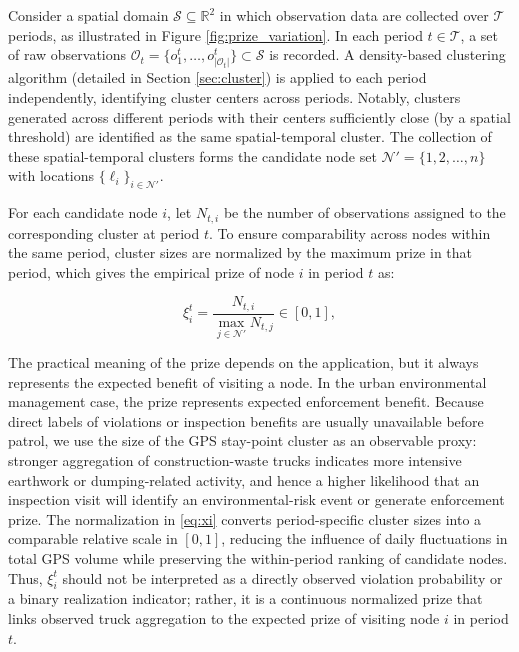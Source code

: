 \documentclass[preprint,12pt,authoryear]{elsarticle}
\theoremstyle{definition}
\begin{document}
Consider a spatial domain $\mathcal{S} \subseteq \mathbb{R}^2$ in which observation data are collected over $\mathcal{T}$ periods, as illustrated in Figure \ref{fig:prize_variation}. In each period $t \in \mathcal{T}$, a set of raw observations $\mathcal{O}_t = \{o_1^t, \dots, o_{|\mathcal{O}_t|}^t\}\subset \mathcal{S}$ is recorded. A density-based clustering algorithm (detailed in Section \ref{sec:cluster}) is applied to each period independently, identifying  cluster centers across periods. Notably, clusters generated across different periods with their centers sufficiently close (by a spatial threshold) are identified as the same spatial-temporal cluster. The collection of these spatial-temporal clusters forms the candidate node set $\mathcal{N'} = \{1, 2, \dots, n\}$ with locations $\{\ell_i\}_{i \in \mathcal{N'}}$.



For each candidate node $i$, let ${N}_{t,i}$ be the number of observations assigned to the corresponding cluster at period $t$. To ensure comparability across nodes within the same period, cluster sizes are normalized by the maximum prize in that period, which gives the empirical prize of node $i$ in period $t$ as:

\begin{equation}
{\xi}^t_i = \frac{{N}_{t,i}}{\max_{j \in \mathcal{N'}} {N}_{t,j}}\in [0,1],
\label{eq:xi}
\end{equation}


The practical meaning of the prize depends on the application, but it always represents the expected benefit of visiting a node. In the urban environmental management case, the prize represents expected enforcement benefit. Because direct labels of violations or inspection benefits are usually unavailable before patrol, we use the size of the GPS stay-point cluster as an observable proxy: stronger aggregation of construction-waste trucks indicates more intensive earthwork or dumping-related activity, and hence a higher likelihood that an inspection visit will identify an environmental-risk event or generate  enforcement prize. The normalization in \eqref{eq:xi} converts period-specific cluster sizes into a comparable relative scale in $[0,1]$, reducing the influence of daily fluctuations in total GPS volume while preserving the within-period ranking of candidate nodes. Thus, $\xi_i^t$ should not be interpreted as a directly observed violation probability or a binary realization indicator; rather, it is a continuous normalized prize that links observed truck aggregation to the expected prize of visiting node $i$ in period $t$.
\end{document}

